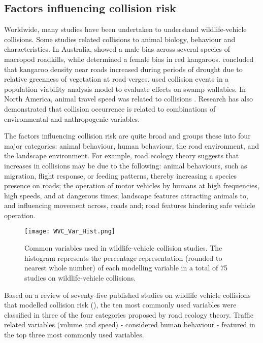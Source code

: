 \subsection{Factors influencing collision risk}

Worldwide, many studies have been undertaken to understand wildlife-vehicle collisions.  Some studies related collisions to animal biology, behaviour and characteristics.  In Australia, \cite{coul97} showed a male bias across several species of macropod roadkills, while \cite{kloc06} determined a female bias in red kangaroos.  \cite{lee04} concluded that kangaroo density near roads increased during periods of drought due to relative greenness of vegetation at road verges. \cite{ramp06b} used collision events in a population viability analysis model to evaluate effects on swamp wallabies.  In North America, animal travel speed was related to collisions \citep{litv08}. Research has also demonstrated that collision occurrence is related to combinations of environmental and anthropogenic variables\citep{barn07}.

The factors influencing collision risk are quite broad and \cite{form03} groups these into four major categories: animal behaviour, human behaviour, the road environment, and the landscape environment. For example, road ecology theory suggests that increases in collisions may be due to the following: animal behaviours, such as migration, flight response, or feeding patterns, thereby increasing a species presence on roads; the operation of motor vehicles by humans at high frequencies, high speeds, and at dangerous times; landscape features attracting animals to, and influencing movement across, roads and; road features hindering safe vehicle operation.

\begin{figure*}[htp]
  \centering
  \texttt{[image: WVC\_Var\_Hist.png]}
  \caption[Variables used in wildlife-vehicle collision studies]{Common variables used in wildlife-vehicle collision studies. The histogram represents the percentage representation (rounded to nearest whole number) of each modelling variable in a total of 75 studies on wildlife-vehicle collisions.}
  \label{wvc_studies}
\end{figure*}

Based on a review of seventy-five published studies on wildlife vehicle collisions that modelled collision risk (), the ten most commonly used variables were classified in three of the four categories proposed by road ecology theory. Traffic related variables (volume and speed) - considered human behaviour - featured in the top three most commonly used variables.

